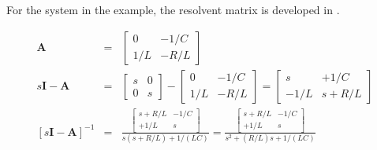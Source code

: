 \ifslidesonly
\begin{slide}

\end{slide}\fi
\ifslidesonly
\begin{slide}

\end{slide}\fi
\ifslidesonly
\begin{slide}

\end{slide}\fi
\ifslidesonly
\begin{slide}
\end{slide}\fi
\ifslidesonly
\begin{slide}
\end{slide}\fi

For the system in the example, the resolvent matrix is developed
in .
\begin{slide}\label{slide:l2eg2}
\begin{eqnarray*}
\mathbf{A}&=&\left[\begin{array}{cc}
  0 & -1/C \\
  1/L & -R/L
\end{array}\right] \\
s\mathbf{I}-\mathbf{A}&=&\left[
\begin{array}{cc}
  s & 0 \\
  0 & s
\end{array}
\right] - \left[
\begin{array}{cc}
  0 & -1/C \\
  1/L & -R/L
\end{array}
\right] = \left[
\begin{array}{cc}
  s & +1/C \\
  -1/L & s+R/L
\end{array}\right] \\
\left[s\mathbf{I}-\mathbf{A}\right]^{-1}&=&\frac{
\left[\begin{array}{cc}
  s+R/L & -1/C \\
  +1/L & s
\end{array} \right]
}{s(s+R/L)+1/(LC)}=\frac{\left[\begin{array}{cc}
  s+R/L & -1/C \\
  +1/L & s
\end{array} \right]}{s^2 + (R/L)s + 1/(LC) }
\end{eqnarray*}
\end{slide}

